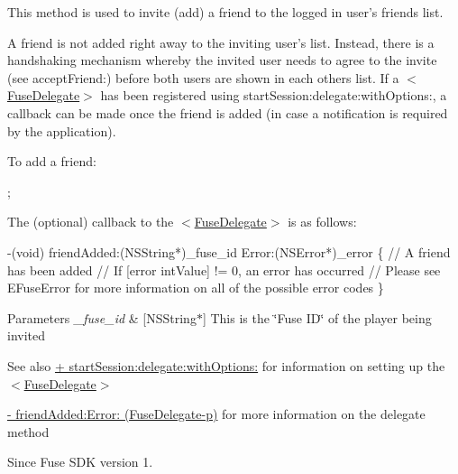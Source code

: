 This method is used to invite (add) a friend to the logged in user's friends list. 

A friend is not added right away to the inviting user's list. Instead, there is a handshaking mechanism whereby the invited user needs to agree to the invite (see accept\+Friend\+:) before both users are shown in each others list. If a $<$\hyperlink{protocol_fuse_delegate-p}{Fuse\+Delegate}$>$ has been registered using start\+Session\+:delegate\+:with\+Options\+:, a callback can be made once the friend is added (in case a notification is required by the application).

To add a friend\+:


\begin{DoxyCode}
;
\end{DoxyCode}


The (optional) callback to the $<$\hyperlink{protocol_fuse_delegate-p}{Fuse\+Delegate}$>$ is as follows\+:


\begin{DoxyCode}
-(void) friendAdded:(NSString*)\_fuse\_id Error:(NSError*)\_error
\{
   \textcolor{comment}{// A friend has been added}
   \textcolor{comment}{// If [error intValue] != 0, an error has occurred}
   \textcolor{comment}{// Please see EFuseError for more information on all of the possible error codes}
\}
\end{DoxyCode}



\begin{DoxyParams}{Parameters}
{\em \+\_\+fuse\+\_\+id} & \mbox{[}N\+S\+String$\ast$\mbox{]} This is the \char`\"{}\+Fuse I\+D\char`\"{} of the player being invited \\
\hline
\end{DoxyParams}
\begin{DoxySeeAlso}{See also}
\hyperlink{interface_fuse_s_d_k_adf7ed64a02b9540c9ded4b931ea4e400}{+ start\+Session\+:delegate\+:with\+Options\+:} for information on setting up the $<$\hyperlink{protocol_fuse_delegate-p}{Fuse\+Delegate}$>$ 

\hyperlink{protocol_fuse_delegate-p_a5c1b86ecfdc9518f976d5ea96156b408}{-\/ friend\+Added\+:\+Error\+: (\+Fuse\+Delegate-\/p)} for more information on the delegate method 
\end{DoxySeeAlso}
\begin{DoxySince}{Since}
Fuse S\+D\+K version 1. 
\end{DoxySince}
\hypertarget{interface_fuse_s_d_k_ac3d0b5c1336b7a2883a6693fd4696ea0}{}
